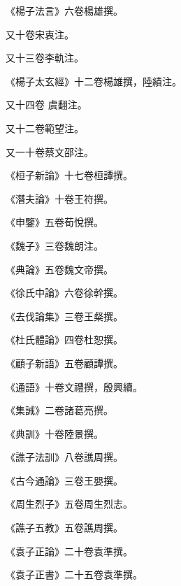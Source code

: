 \begin{pinyinscope}
 《楊子法言》六卷楊雄撰。



 又十卷宋衷注。



 又十三卷李軌注。



 《楊子太玄經》十二卷楊雄撰，陸績注。



 又十四卷
 虞翻注。



 又十二卷範望注。



 又一十卷蔡文邵注。



 《桓子新論》十七卷桓譚撰。



 《潛夫論》十卷王符撰。



 《申鑒》五卷荀悅撰。



 《魏子》三卷魏朗注。



 《典論》五卷魏文帝撰。



 《徐氏中論》六卷徐幹撰。



 《去伐論集》三卷王粲撰。



 《杜氏體論》四卷杜恕撰。



 《顧子新語》五卷顧譚撰。



 《通語》十卷文禮撰，殷興續。



 《集誡》二卷諸葛亮撰。



 《典訓》十卷陸景撰。



 《譙子法訓》八卷譙周撰。



 《古今通論》三卷王嬰撰。



 《周生烈子》五卷周生烈志。



 《譙子五教》五卷譙周撰。



 《袁子正論》二十卷袁準撰。



 《袁子正書》二十五卷袁準撰。




\end{pinyinscope}
